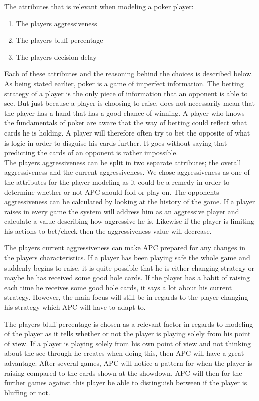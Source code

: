 The attributes that is relevant when modeling a poker player:
\begin{enumerate}
  \item The players aggressiveness
  \item The players bluff percentage
  \item The players decision delay
\end{enumerate}

Each of these attributes and the reasoning behind the choices is described below.\\

As being stated earlier, poker is a game of imperfect information. The betting strategy of a player is the only piece of information that an opponent is able to see.
But just because a player is choosing to raise, does not necessarily mean that the player has a hand that has a good chance of winning.
A player who knows the fundamentals of poker are aware that the way of betting could reflect what cards he is holding. A player will therefore often try to bet the opposite of what is logic in order to disguise his cards further.
It goes without saying that predicting the cards of an opponent is rather impossible. \\

The players aggressiveness can be split in two separate attributes; the overall aggressiveness and the current aggressiveness. We chose aggressiveness as one of the attributes for the player modeling as it could be a remedy in order to determine whether or not APC should fold or play on.
The opponents aggressiveness can be calculated by looking at the history of the game. If a player raises in every game the system will address him as an aggressive player and calculate a value describing how aggressive he is. Likewise if the player is limiting his actions to bet/check then the aggressiveness value will decrease. 

The players current aggressiveness can make APC prepared for any changes in the players characteristics. If a player has been playing safe the whole game and suddenly begins to raise, it is quite possible that he is either changing strategy or maybe he has received some good hole cards. If the player has a habit of raising each time he receives some good hole cards, it says a lot about his current strategy. However, the main focus will still be in regards to the player changing his strategy which APC will have to adapt to.

The players bluff percentage is chosen as a relevant factor in regards to modeling of the player as it tells whether or not the player is playing solely from his point of view. If a player is playing solely from his own point of view and not thinking about the see-through he creates when doing this, then APC will have a great advantage. After several games, APC will notice a pattern for when the player is raising compared to the cards shown at the showdown. APC will then for the further games against this player be able to distinguish between if the player is bluffing or not.


